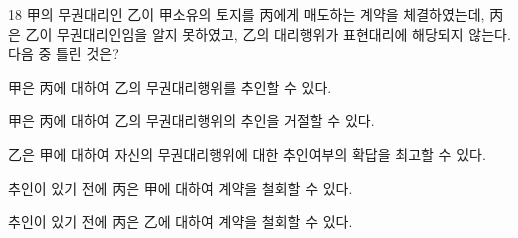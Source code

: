 \begin{question}{18}
甲의 무권대리인 乙이 甲소유의 토지를 丙에게 매도하는 계약을 체결하였는데, 丙은 乙이 무권대리인임을 알지 못하였고, 乙의 대리행위가 표현대리에 해당되지 않는다. 다음 중 틀린 것은?
\begin{choices}
  \item 甲은 丙에 대하여 乙의 무권대리행위를 추인할 수 있다.
  \item 甲은 丙에 대하여 乙의 무권대리행위의 추인을 거절할 수 있다.
  \item 乙은 甲에 대하여 자신의 무권대리행위에 대한 추인여부의 확답을 최고할 수 있다.
  \item 추인이 있기 전에 丙은 甲에 대하여 계약을 철회할 수 있다.
  \item 추인이 있기 전에 丙은 乙에 대하여 계약을 철회할 수 있다.
\end{choices}
\end{question}
